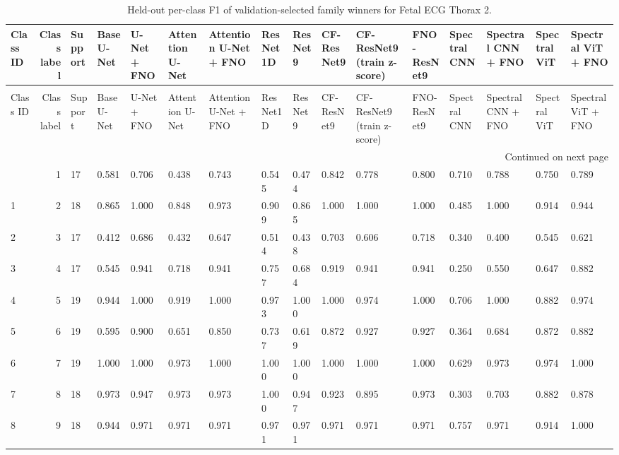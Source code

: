 \begin{longtable}{lrllllllllllllll}
\caption{Held-out per-class F1 of validation-selected family winners for Fetal ECG Thorax 2.} \label{tab:noninvasivefetalecgthorax2_per_class_f1} \\
\toprule
Class ID & Class label & Support & Base U-Net & U-Net + FNO & Attention U-Net & Attention U-Net + FNO & ResNet1D & ResNet9 & CF-ResNet9 & CF-ResNet9 (train z-score) & FNO-ResNet9 & Spectral CNN & Spectral CNN + FNO & Spectral ViT & Spectral ViT + FNO \\
\midrule
\endfirsthead
\caption[]{Held-out per-class F1 of validation-selected family winners for Fetal ECG Thorax 2.} \\
\toprule
Class ID & Class label & Support & Base U-Net & U-Net + FNO & Attention U-Net & Attention U-Net + FNO & ResNet1D & ResNet9 & CF-ResNet9 & CF-ResNet9 (train z-score) & FNO-ResNet9 & Spectral CNN & Spectral CNN + FNO & Spectral ViT & Spectral ViT + FNO \\
\midrule
\endhead
\midrule
\multicolumn{16}{r}{Continued on next page} \\
\midrule
\endfoot
\bottomrule
\endlastfoot
0 & 1 & 17 & 0.581 & 0.706 & 0.438 & 0.743 & 0.545 & 0.474 & 0.842 & 0.778 & 0.800 & 0.710 & 0.788 & 0.750 & 0.789 \\
1 & 2 & 18 & 0.865 & 1.000 & 0.848 & 0.973 & 0.909 & 0.865 & 1.000 & 1.000 & 1.000 & 0.485 & 1.000 & 0.914 & 0.944 \\
2 & 3 & 17 & 0.412 & 0.686 & 0.432 & 0.647 & 0.514 & 0.438 & 0.703 & 0.606 & 0.718 & 0.340 & 0.400 & 0.545 & 0.621 \\
3 & 4 & 17 & 0.545 & 0.941 & 0.718 & 0.941 & 0.757 & 0.684 & 0.919 & 0.941 & 0.941 & 0.250 & 0.550 & 0.647 & 0.882 \\
4 & 5 & 19 & 0.944 & 1.000 & 0.919 & 1.000 & 0.973 & 1.000 & 1.000 & 0.974 & 1.000 & 0.706 & 1.000 & 0.882 & 0.974 \\
5 & 6 & 19 & 0.595 & 0.900 & 0.651 & 0.850 & 0.737 & 0.619 & 0.872 & 0.927 & 0.927 & 0.364 & 0.684 & 0.872 & 0.882 \\
6 & 7 & 19 & 1.000 & 1.000 & 0.973 & 1.000 & 1.000 & 1.000 & 1.000 & 1.000 & 1.000 & 0.629 & 0.973 & 0.974 & 1.000 \\
7 & 8 & 18 & 0.973 & 0.947 & 0.973 & 0.973 & 1.000 & 0.947 & 0.923 & 0.895 & 0.973 & 0.303 & 0.703 & 0.882 & 0.878 \\
8 & 9 & 18 & 0.944 & 0.971 & 0.971 & 0.971 & 0.971 & 0.971 & 0.971 & 0.971 & 0.971 & 0.757 & 0.971 & 0.914 & 1.000 \\

\end{longtable}

